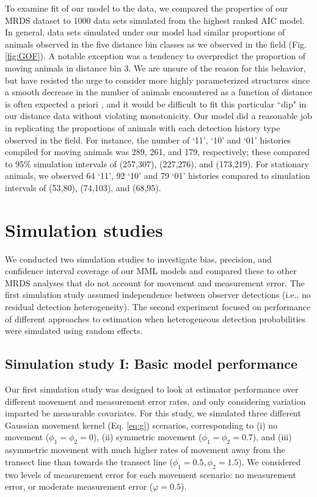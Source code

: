 \documentclass[12pt,fleqn]{article}
\begin{document}
To examine fit of our model to the data, we compared the properties of our MRDS dataset to 1000 data sets simulated from the highest ranked AIC model.  In general, data sets simulated under our model had similar proportions of animals observed in the five distance bin classes as we observed in the field (Fig. \ref{fig:GOF}).  A notable exception was a tendency to overpredict the proportion of moving animals in distance bin 3.  We are unsure of the reason for this behavior, but have resisted the urge to consider more highly parameterized structures since a smooth decrease in the number of animals encountered as a function of distance is often expected a priori \citep{BucklandEtAl2001}, and it would be difficult to fit this particular ``dip" in our distance data without violating monotonicity.  Our model did a reasonable job in replicating the proportions of animals with each detection history type observed in the field.  For instance, the number of `11', `10' and `01' histories compiled for moving animals was 289, 261, and 179, respectively; these compared to 95\% simulation intervals of (257,307), (227,276), and (173,219).  For stationary animals, we observed 64 `11', 92 `10' and 79 `01' histories compared to simulation intervals of (53,80), (74,103), and (68,95).


\section{Simulation studies}

We conducted two simulation studies to investigate bias, precision, and confidence interval coverage of our MML models and compared these to other MRDS analyses that do not account for movement and measurement error.  The first simulation study assumed independence between observer detections (i.e., no residual detection heterogeneity).  The second experiment focused on performance of different approaches to estimation when heterogeneous detection probabilities were simulated using random effects.

\subsection{Simulation study I: Basic model performance}

Our first simulation study was designed to look at estimator performance over different movement and measurement error rates, and only considering variation imparted be measurable covariates.  For this study, we simulated  three different Gaussian movement kernel (Eq. \ref{eq:g}) scenarios, corresponding to (i) no movement ($\phi_1 = \phi_2 = 0$), (ii) symmetric movement ($\phi_1 = \phi_2 = 0.7$), and (iii) asymmetric movement with much higher rates of movement away from the transect line than towards the transect line ($\phi_1 = 0.5, \phi_2 = 1.5$).  We considered two levels of measurement error for each movement scenario: no measurement error, or moderate measurement error ($\varphi = 0.5$).
\end{document}
